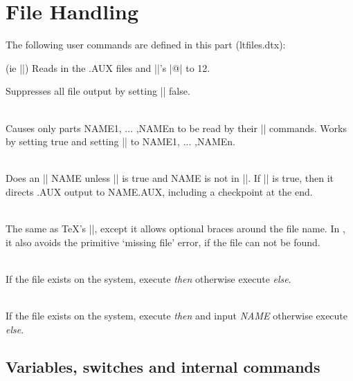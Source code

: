 
 \chapter{File Handling}
\label{ch:ltfiles}
 The following user commands are defined in this part (ltfiles.dtx):

   (ie ||)
      Reads in the .AUX files and |\catcode|'s |@| to 12.
  

       Suppresses all file output by setting |\@filesw| false.


  \\
       Causes only parts NAME1, ... ,NAMEn to be read by
         their || commands.  Works by setting \@partsw true
         and setting |\@partlist| to NAME1, ... ,NAMEn.
  

  \\
        Does an || NAME unless |\@partsw| is true and
         NAME is not in |\@partlist|.  If |\@filesw| is true, then
         it directs .AUX output to NAME.AUX, including a
         checkpoint at the end.
  

 \\
        The same as TeX's ||, except it allows optional
         braces around the file name. In \LaTeXe, it also avoids
         the primitive `missing file' error, if the file can not be
         found.
 

 \\
   If the file exists on the system, execute \emph{then} otherwise
   execute \emph{else}.
 

 \\
   If the file exists on the system, execute \emph{then} and input
   \emph{NAME}  otherwise execute \emph{else}.



\section{Variables, switches and internal commands}

